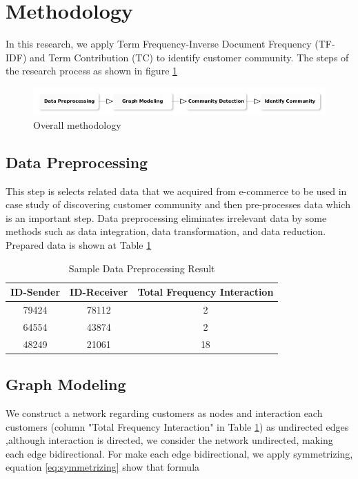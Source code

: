 \documentclass[conference]{IEEEtran}
\begin{document}
\section{Methodology}
In this research, we apply Term Frequency-Inverse Document Frequency (TF-IDF) and Term Contribution (TC) to identify customer community. The steps of the research process as shown in figure \ref{overall_methodology}

\begin{figure}[h]
\centering
\includegraphics[width=\columnwidth]{figure/overall_methodology}
\caption{Overall methodology}
\label{overall_methodology}
\end{figure}

\subsection{Data Preprocessing}
This step is selects related data that we acquired from e-commerce to be used in case study of discovering customer community and then pre-processes data which is an important step. Data preprocessing eliminates irrelevant data by some methods such as data integration, data transformation, and data reduction. Prepared data is shown at Table \ref{tab:sample_data_preprocessing_result}

\begin{table}[h]
\renewcommand{\arraystretch}{1.3}
\caption{Sample Data Preprocessing Result}
\label{tab:sample_data_preprocessing_result}
\centering
\begin{tabular}{c|c|c}
    \hline
    ID-Sender  &  ID-Receiver & Total Frequency Interaction\\
    \hline
    79424 & 78112 & 2\\
    \hline
    64554 & 43874 & 2\\
    \hline
    48249 & 21061 & 18\\
    \hline
\end{tabular}
\end{table}

\subsection{Graph Modeling}
We construct a network regarding customers as nodes and interaction each customers (column "Total Frequency Interaction" in Table \ref{tab:sample_data_preprocessing_result}) as undirected edges ,although interaction is directed, we consider the network undirected, making each edge bidirectional. For make each edge bidirectional, we apply symmetrizing, equation \ref{eq:symmetrizing} show that formula \cite{Gopalakrishnan}
\end{document}
